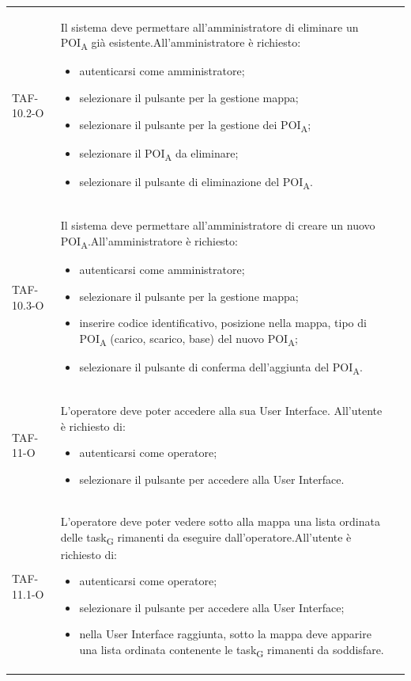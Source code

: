 \begin{longtable}{ >{\centering}p{} >{}p{}
		>{\centering}p{}}
	TAF-10.2-O & Il sistema deve permettare all'amministratore di eliminare un \acrshort{POI}\textsubscript{A} già esistente.\newline All'amministratore è richiesto: \begin{itemize}\item autenticarsi come amministratore; \item selezionare il pulsante per la gestione mappa; \item selezionare il pulsante per la gestione dei \acrshort{POI}\textsubscript{A}; \item selezionare il \acrshort{POI}\textsubscript{A} da eliminare; \item selezionare il pulsante di eliminazione del \acrshort{POI}\textsubscript{A}.\end{itemize} & 0\tabularnewline
	
	TAF-10.3-O & Il sistema deve permettare all'amministratore di creare un nuovo \acrshort{POI}\textsubscript{A}.\newline All'amministratore è richiesto: \begin{itemize}\item autenticarsi come amministratore; \item selezionare il pulsante per la gestione mappa; \item inserire codice identificativo, posizione nella mappa, tipo di \acrshort{POI}\textsubscript{A} (carico, scarico, base) del nuovo \acrshort{POI}\textsubscript{A}; \item selezionare il pulsante di conferma dell'aggiunta del \acrshort{POI}\textsubscript{A}.\end{itemize} & 0\tabularnewline
	
	TAF-11-O & L'operatore deve poter accedere alla sua User Interface. All'utente è richiesto di: \begin{itemize} \item autenticarsi come operatore; \item selezionare il pulsante per accedere alla User Interface.\end{itemize} & 0\tabularnewline
	
	TAF-11.1-O & L'operatore deve poter vedere sotto alla mappa una lista ordinata delle \gls{task}\textsubscript{G} rimanenti da eseguire dall'operatore.\newline All'utente è richiesto di: \begin{itemize} \item autenticarsi come operatore; \item selezionare il pulsante per accedere alla User Interface; \item nella User Interface raggiunta, sotto la mappa deve apparire una lista ordinata contenente le \gls{task}\textsubscript{G} rimanenti da soddisfare.\end{itemize} & 0\tabularnewline
	

\end{longtable}
